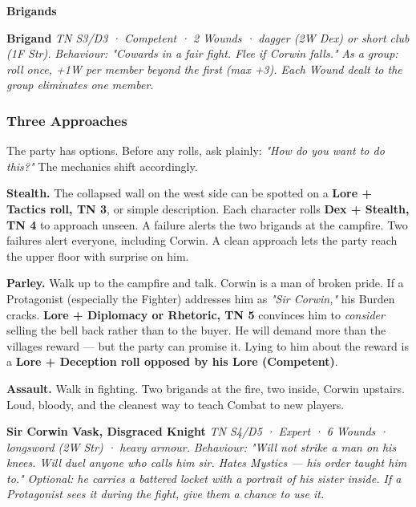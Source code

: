 \documentclass[10pt,a4paper]{article}
\begin{document}
\par\smallskip\begin{rpgnote}[fontupper=\normalfont]\textbf{Brigands}\par\smallskip \textbf{Brigand} \emph{TN S3/D3 · Competent · 2 Wounds · dagger (2W Dex) or short club (1F Str).} \emph{Behaviour: "Cowards in a fair fight. Flee if Corwin falls."} \emph{As a group: roll once, +1W per member beyond the first (max +3). Each Wound dealt to the group eliminates one member.}\end{rpgnote}\par\smallskip
\subsubsection{Three Approaches}\label{three-approaches}

The party has options. Before any rolls, ask plainly: \emph{"How do you want to do this?"} The mechanics shift accordingly.

\textbf{Stealth.} The collapsed wall on the west side can be spotted on a \textbf{Lore + Tactics roll, TN 3}, or simple description. Each character rolls \textbf{Dex + Stealth, TN 4} to approach unseen. A failure alerts the two brigands at the campfire. Two failures alert everyone, including Corwin. A clean approach lets the party reach the upper floor with surprise on him.

\par{}\noindent\textbf{Parley.} Walk up to the campfire and talk. Corwin is a man of broken pride. If a Protagonist (especially the Fighter) addresses him as \emph{"Sir Corwin,"} his Burden cracks. \textbf{Lore + Diplomacy or Rhetoric, TN 5} convinces him to \emph{consider} selling the bell back rather than to the buyer. He will demand more than the village\textquotesingle s reward --- but the party can promise it. Lying to him about the reward is a \textbf{Lore + Deception roll opposed by his Lore (Competent)}.

\textbf{Assault.} Walk in fighting. Two brigands at the fire, two inside, Corwin upstairs. Loud, bloody, and the cleanest way to teach Combat to new players.

\par\smallskip\begin{rpgnote}[fontupper=\normalfont]\textbf{Sir Corwin Vask, Disgraced Knight} \emph{TN S4/D5 · Expert · 6 Wounds · longsword (2W Str) · heavy armour.} \emph{Behaviour: "Will not strike a man on his knees. Will duel anyone who calls him \textquotesingle sir\textquotesingle. Hates Mystics --- his order taught him to."} \emph{Optional: he carries a battered locket with a portrait of his sister inside. If a Protagonist sees it during the fight, give them a chance to use it.}\end{rpgnote}\par\smallskip
\end{document}
